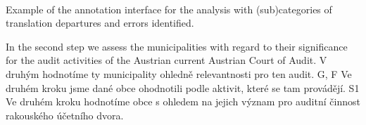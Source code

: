 \documentclass[output=paper]{langscibook}
\begin{document}
%

%
%
%
%
%



\ \ \\
Example of the annotation interface for the analysis with (sub)categories of translation departures and errors identified.

\ea In the second step we assess the municipalities with regard to their significance for the audit activities of the Austrian current Austrian Court of Audit.
  \ea 
    \ea  
        \ex V druhým hodnotíme ty municipality ohledně relevantnosti pro ten audit.
        \ex G, F
    \z
  \ex
    \ea Ve druhém kroku jsme dané obce ohodnotili podle aktivit, které se tam provádějí.
    \ex  S1
    \z
  \ex
    \ea  Ve druhém kroku hodnotíme obce s ohledem na jejich význam pro auditní činnost rakouského účetního dvora.
    \ex ~
    \z
  \z
\z
\end{document}
